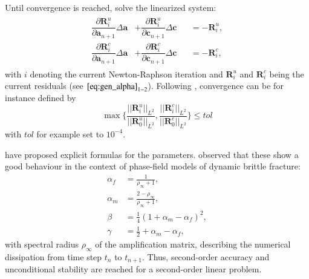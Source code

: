 Until convergence is reached, solve the linearized system:
\begin{equation} \label{eq:NewtonRaphson}
	\begin{aligned}
	\begin{alignedat}{2}
		\dfrac{\partial\mathbf{R}_{i}^{u}}{\partial\mathbf{a}_{n+1}}\Delta \mathbf{a} &+ \dfrac{\partial\mathbf{R}_{i}^{u}}{\partial\mathbf{c}_{n+1}}\Delta\mathbf{c} &&= -\mathbf{R}_{i}^{u}, \\
		\dfrac{\partial\mathbf{R}_{i}^{c}}{\partial\mathbf{a}_{n+1}}\Delta \mathbf{a} &+ \dfrac{\partial\mathbf{R}_{i}^{c}}{\partial\mathbf{c}_{n+1}}\Delta\mathbf{c} &&= -\mathbf{R}_{i}^{c},
	\end{alignedat}
	\end{aligned}
\end{equation}
with $i$ denoting the current Newton-Raphson iteration and $\mathbf{R}_{i}^{u}$ and $\mathbf{R}_{i}^{c}$ being the current residuals (see $\eqref{eq:gen_alpha}_{1-2}$). Following \citet{01_PF_dyn_brittle}, convergence can be for instance defined by
\begin{equation} \label{eq:conv_cond}
	\max\{\frac{||\mathbf{R}_{i}^{u}||_{L^{2}}}{||\mathbf{R}_{0}^{u}||_{L^{2}}},\frac{||\mathbf{R}_{i}^{c}||_{L^{2}}}{||\mathbf{R}_{0}^{c}||_{L^{2}}}\}\leq tol
\end{equation}
with $tol$ for example set to $10^{-4}$.

\citet{10_PF_genAlpha} have proposed explicit formulas for the parameters. \citet{01_PF_dyn_brittle} observed that these show a good behaviour in the context of phase-field models of dynamic brittle fracture:
\begin{equation}
	\begin{aligned}
		\alpha_{f} &= \frac{1}{\rho_{\infty}+1}, \\
		\alpha_{m} &= \frac{2-\rho_{\infty}}{\rho_{\infty}+1}, \\
		\beta &= \frac{1}{4}\left(1+\alpha_{m}-\alpha_{f}\right)^{2}, \\
		\gamma &= \frac{1}{2}+\alpha_{m}-\alpha_{f},
	\end{aligned}
\end{equation}
with spectral radius $\rho_{\infty}$ of the amplification matrix, describing the numerical dissipation from time step $t_{n}$ to $t_{n+1}$. Thus, second-order accuracy and unconditional stability are reached for a second-order linear problem.
